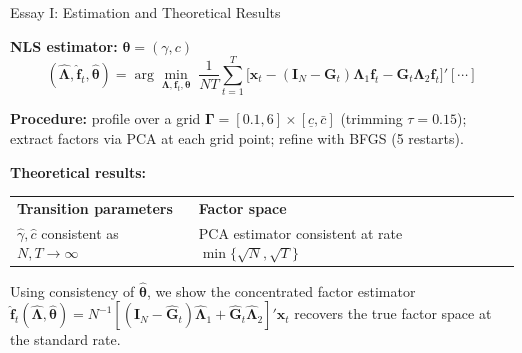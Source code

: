 \documentclass{beamer}
\begin{document}
\begin{frame}{Essay I: Estimation and Theoretical Results}

\textbf{NLS estimator:} \quad $\boldsymbol{\theta}=(\gamma,c)$
\[
(\hat{\boldsymbol{\Lambda}},\hat{\boldsymbol{f}}_t,\hat{\boldsymbol{\theta}}) = \arg\min_{\boldsymbol{\Lambda},\boldsymbol{f}_t,\boldsymbol{\theta}}\;
  \frac{1}{NT}\sum_{t=1}^{T}
  \bigl[\boldsymbol{x}_t - (\boldsymbol{I}_N{-}\boldsymbol{G}_t)\boldsymbol{\Lambda}_1\boldsymbol{f}_t - \boldsymbol{G}_t\boldsymbol{\Lambda}_2\boldsymbol{f}_t\bigr]'[\cdots]
\]

\textbf{Procedure:} profile over a grid $\boldsymbol{\Gamma}=[0.1,6]\times [\underline{c},\bar{c}]$ (trimming $\tau=0.15$); extract factors via PCA at each grid point; refine with BFGS (5 restarts).

\vspace{0.5em}
\textbf{Theoretical results:}

\begin{tabular}{p{} p{}}
\textbf{Transition parameters} & \textbf{Factor space} \\[2pt]
$\hat{\gamma},\hat{c}$ consistent as $N,T\to\infty$ &
  PCA estimator consistent at rate $\min\{\sqrt{N},\sqrt{T}\}$ \\
\end{tabular}

\vspace{0.4em}
{\small Using consistency of $\hat{\boldsymbol{\theta}}$, we show the concentrated factor estimator $\hat{\boldsymbol{f}}_t(\hat{\boldsymbol{\Lambda}},\hat{\boldsymbol{\theta}}) = N^{-1}[(\boldsymbol{I}_N-\hat{\boldsymbol{G}}_t)\hat{\boldsymbol{\Lambda}}_1+\hat{\boldsymbol{G}}_t\hat{\boldsymbol{\Lambda}}_2]'\boldsymbol{x}_t$ recovers the true factor space at the standard rate.}

\end{frame}
\end{document}
